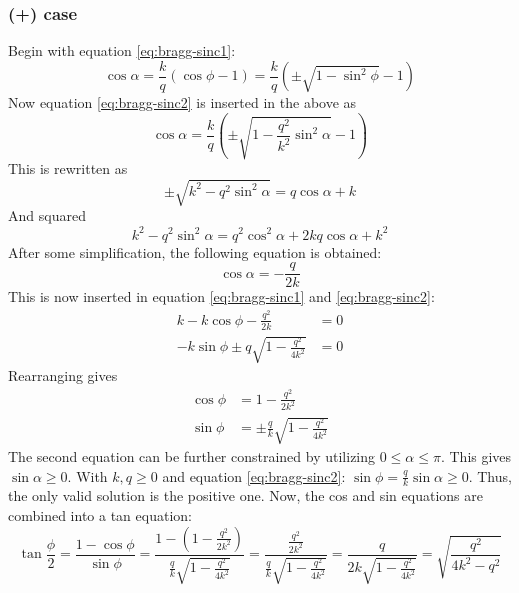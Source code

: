 \documentclass[10pt,a4paper,draft]{scrartcl}
\begin{document}
	\subsubsection{(+) case}
	Begin with equation \ref{eq:bragg-sinc1}:
	\begin{equation*}
		\cos{\alpha} = \frac{k}{q}\left( \cos{\phi} - 1 \right) = \frac{k}{q}\left( \pm \sqrt{1-\sin^2{\phi}} - 1 \right)
	\end{equation*}
	Now equation \ref{eq:bragg-sinc2} is inserted in the above as
	\begin{equation*}
		\cos{\alpha} = \frac{k}{q}\left( \pm \sqrt{1-\frac{q^2}{k^2}\sin^2{\alpha}} - 1 \right)
	\end{equation*}
	This is rewritten as
	\begin{equation*}
		\pm \sqrt{k^2-q^2\sin^2{\alpha}} = q\cos{\alpha} + k
	\end{equation*}
	And squared
	\begin{equation*}
		k^2 - q^2\sin^2{\alpha} = q^2\cos^2{\alpha} + 2kq\cos{\alpha} + k^2
	\end{equation*}
	After some simplification, the following equation is obtained:
	\begin{equation*}
		\cos{\alpha} = -\frac{q}{2k}
	\end{equation*}
	This is now inserted in equation \ref{eq:bragg-sinc1} and \ref{eq:bragg-sinc2}:
	\begin{align*}
		k - k\cos{\phi} - \frac{q^2}{2k} &= 0 \\
		-k\sin{\phi} \pm q\sqrt{1-\frac{q^2}{4k^2}} &= 0
	\end{align*}
	Rearranging gives
	\begin{align*}
		\cos{\phi} &= 1 - \frac{q^2}{2k^2} \\
		\sin{\phi} &= \pm \frac{q}{k} \sqrt{1-\frac{q^2}{4k^2}}
	\end{align*}
	The second equation can be further constrained by utilizing $0 \leq \alpha \leq \pi$. This gives $\sin{\alpha} \geq 0$. With $k,q \geq 0$ and equation \ref{eq:bragg-sinc2}: $\sin{\phi} = \frac{q}{k}\sin{\alpha} \geq 0$. Thus, the only valid solution is the positive one. Now, the cos and sin equations are combined into a tan equation:
	\begin{equation*}
		\tan{\frac{\phi}{2}} = \frac{1 - \cos{\phi}}{\sin{\phi}} = \frac{1 - \left( 1 - \frac{q^2}{2k^2} \right)}{\frac{q}{k} \sqrt{1-\frac{q^2}{4k^2}}} = \frac{\frac{q^2}{2k^2} }{\frac{q}{k} \sqrt{1-\frac{q^2}{4k^2}}} = \frac{q}{2k\sqrt{1-\frac{q^2}{4k^2}}} = \sqrt{\frac{q^2}{4k^2-q^2}}
	\end{equation*}
	
\end{document}
